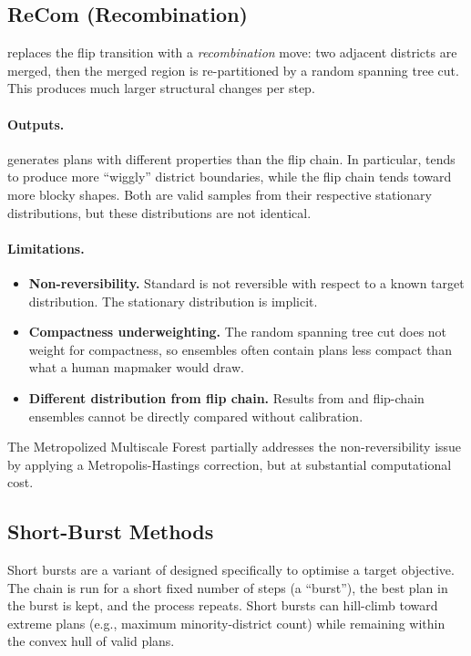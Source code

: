 \subsection{ReCom (Recombination)}

\recom{} \citep{deford2021recombination} replaces the flip transition with
a \emph{recombination} move: two adjacent districts are merged, then the
merged region is re-partitioned by a random spanning tree cut.  This
produces much larger structural changes per step.

\paragraph{Outputs.} \recom{} generates plans with different properties
than the flip chain.  In particular, \recom{} tends to produce more
``wiggly'' district boundaries, while the flip chain tends toward more
blocky shapes.  Both are valid samples from their respective stationary
distributions, but these distributions are not identical.

\paragraph{Limitations.}
\begin{itemize}
  \item \textbf{Non-reversibility.} Standard \recom{} is not reversible
    with respect to a known target distribution.  The stationary
    distribution is implicit.
  \item \textbf{Compactness underweighting.} The random spanning tree cut
    does not weight for compactness, so \recom{} ensembles often contain
    plans less compact than what a human mapmaker would draw.
  \item \textbf{Different distribution from flip chain.} Results from
    \recom{} and flip-chain ensembles cannot be directly compared without
    calibration.
\end{itemize}

The \citet{autry2021multiscale} Metropolized Multiscale Forest \recom{}
partially addresses the non-reversibility issue by applying a
Metropolis-Hastings correction, but at substantial computational cost.

\subsection{Short-Burst Methods}

Short bursts \citep{cannon2022voting} are a variant of \recom{} designed
specifically to optimise a target objective.  The chain is run for a
short fixed number of steps (a ``burst''), the best plan in the burst is
kept, and the process repeats.  Short bursts can hill-climb toward extreme
plans (e.g., maximum minority-district count) while remaining within the
convex hull of valid plans.

